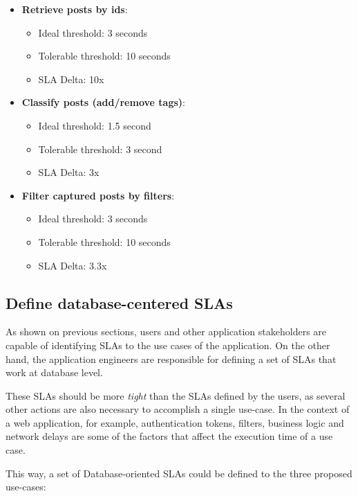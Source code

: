 \begin{itemize}
	\item{\textbf{Retrieve posts by ids}:
		\begin{itemize}
		\item{Ideal threshold: 3 seconds}
		\item{Tolerable threshold: 10 seconds}
		\item{SLA Delta: 10x}
		\end{itemize}
	}

	\item{\textbf{Classify posts (add/remove tags)}:
		\begin{itemize}
		\item{Ideal threshold: 1.5 second}
		\item{Tolerable threshold: 3 second}
		\item{SLA Delta: 3x}
		\end{itemize}
	}

	\item{\textbf{Filter captured posts by filters}:
		\begin{itemize}
		\item{Ideal threshold: 3 seconds}
		\item{Tolerable threshold: 10 seconds}
		\item{SLA Delta: 3.3x}
		\end{itemize}
	}

	\end{itemize}

\clearpage
\subsection{Define database-centered SLAs}
As shown on previous sections, users and other application stakeholders are capable of identifying SLAs to the use cases of the application. On the other hand, the application engineers are responsible for defining a set of SLAs that work at database level. 

These SLAs should be more \textit{tight} than the SLAs defined by the users, as several other actions are also necessary to accomplish a single use-case. In the context of a web application, for example, authentication tokens, filters, business logic and network delays are some of the factors that affect the execution time of a use case. 

This way, a set of Database-oriented SLAs could be defined to the three proposed use-cases: 

